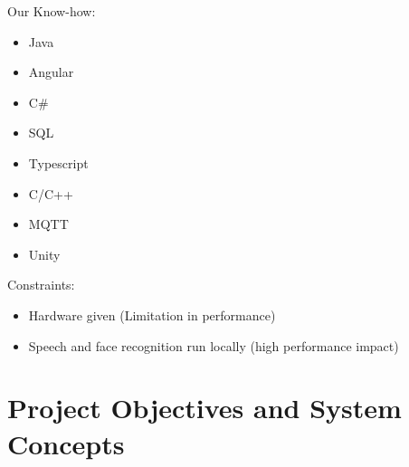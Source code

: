 \documentclass[12pt]{article}
\theoremstyle{definition}
\begin{document}
Our Know-how:
\begin{itemize}
	\item Java
	\item Angular
	\item C\#
	\item SQL
	\item Typescript
	\item C/C++
	\item MQTT
	\item Unity
\end{itemize}
\newline
Constraints:
\begin{itemize}
	\item Hardware given (Limitation in performance)
	\item Speech and face recognition run locally (high performance impact)
\end{itemize}

\pagebreak

\section{Project Objectives and System Concepts}
\end{document}
